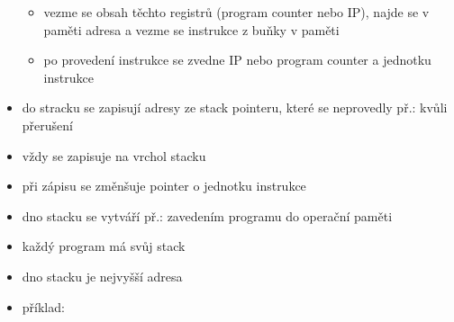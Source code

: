 \documentclass[a4paper,12pt]{article}
\providecommand{\tightlist}{%
\setlength{\itemsep}{0pt}\setlength{\parskip}{0pt}}
\begin{document}
\begin{itemize}
  \begin{itemize}
  \tightlist
  \item vezme se obsah těchto registrů (program counter nebo IP), najde se v
    paměti adresa a vezme se instrukce z buňky v paměti
  \item po provedení instrukce se zvedne IP nebo program counter a jednotku
    instrukce
  \end{itemize}
\item do stracku se zapisují adresy ze stack pointeru, které se neprovedly
  př.: kvůli přerušení
\item vždy se zapisuje na vrchol stacku
\item při zápisu se změnšuje pointer o jednotku instrukce
\item dno stacku se vytváří př.: zavedením programu do operační paměti
\item každý program má svůj stack
\item dno stacku je nejvyšší adresa
\item příklad:
\end{itemize}
\end{document}
